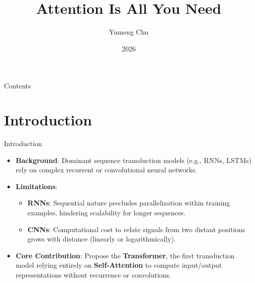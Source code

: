 \documentclass{beamer}
\title[Attention Is All You Need]{Attention Is All You Need}
\author{Yumeng Chu}
\institute[NJUST] {Nanjing University of Science and Technology}
\date{ 2026}
\begin{document}
\begin{frame}
    \titlepage 
\end{frame}

\begin{frame}{Contents}
    \tableofcontents
\end{frame}

\section{Introduction}
\begin{frame}{Introduction}
    \begin{itemize}
        \item \textbf{Background}: Dominant sequence transduction models (e.g., RNNs, LSTMs) rely on complex recurrent or convolutional neural networks.
        \item \textbf{Limitations}: 
        \begin{itemize}
            \item \textbf{RNNs}: Sequential nature precludes parallelization within training examples, hindering scalability for longer sequences.
            \item \textbf{CNNs}: Computational cost to relate signals from two distant positions grows with distance (linearly or logarithmically).
        \end{itemize}
        \item \textbf{Core Contribution}: Propose the \textbf{Transformer}, the first transduction model relying entirely on \textbf{Self-Attention} to compute input/output representations without recurrence or convolutions.
    \end{itemize}
\end{frame}
\end{document}
